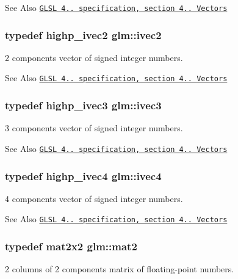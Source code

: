 \begin{DoxySeeAlso}{See Also}
\href{http://www.opengl.org/registry/doc/GLSLangSpec.4.20.8.pdf}{\tt G\-L\-S\-L 4.. specification, section 4.. Vectors} 
\end{DoxySeeAlso}
\hypertarget{group__core__types_ga9e6ce9cfc7919976b318197e18d8a065}{
\subsubsection[{ivec2}]{\setlength{\rightskip}{0pt plus 5cm}typedef highp\-\_\-ivec2 {\bf glm\-::ivec2}}}\label{group__core__types_ga9e6ce9cfc7919976b318197e18d8a065}
2 components vector of signed integer numbers.

\begin{DoxySeeAlso}{See Also}
\href{http://www.opengl.org/registry/doc/GLSLangSpec.4.20.8.pdf}{\tt G\-L\-S\-L 4.. specification, section 4.. Vectors} 
\end{DoxySeeAlso}
\hypertarget{group__core__types_ga6e12a4ca00d696f07da1df4eb73e0fe8}{
\subsubsection[{ivec3}]{\setlength{\rightskip}{0pt plus 5cm}typedef highp\-\_\-ivec3 {\bf glm\-::ivec3}}}\label{group__core__types_ga6e12a4ca00d696f07da1df4eb73e0fe8}
3 components vector of signed integer numbers.

\begin{DoxySeeAlso}{See Also}
\href{http://www.opengl.org/registry/doc/GLSLangSpec.4.20.8.pdf}{\tt G\-L\-S\-L 4.. specification, section 4.. Vectors} 
\end{DoxySeeAlso}
\hypertarget{group__core__types_gaa4560ddc50320ea8f8a70d5c9c249fea}{
\subsubsection[{ivec4}]{\setlength{\rightskip}{0pt plus 5cm}typedef highp\-\_\-ivec4 {\bf glm\-::ivec4}}}\label{group__core__types_gaa4560ddc50320ea8f8a70d5c9c249fea}
4 components vector of signed integer numbers.

\begin{DoxySeeAlso}{See Also}
\href{http://www.opengl.org/registry/doc/GLSLangSpec.4.20.8.pdf}{\tt G\-L\-S\-L 4.. specification, section 4.. Vectors} 
\end{DoxySeeAlso}
\hypertarget{group__core__types_ga8357ec0aab6f8cf69313592492663c3f}{
\subsubsection[{mat2}]{\setlength{\rightskip}{0pt plus 5cm}typedef mat2x2 {\bf glm\-::mat2}}}\label{group__core__types_ga8357ec0aab6f8cf69313592492663c3f}
2 columns of 2 components matrix of floating-\/point numbers.

